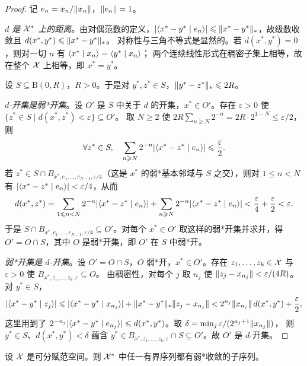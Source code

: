 \begin{proof}
记 $e_n=x_n/\lVert x_n\rVert$，$\lVert e_n\rVert=1$。

\emph{$d$ 是 $\mathcal{X}^{*}$ 上的距离}。由对偶范数的定义，$\lvert \langle x^*-y^* \mid e_n\rangle\rvert\leqslant\lVert x^*-y^*\rVert_*$，故级数收敛且 $d(x^*,y^*)\leqslant\lVert x^*-y^*\rVert_*$。
对称性与三角不等式是显然的。若 $d(x^*,y^*)=0$，则对一切 $n$ 有 $\langle x^* \mid x_n\rangle=\langle y^* \mid x_n\rangle$；
两个连续线性形式在稠密子集上相等，故在整个 $\mathcal{X}$ 上相等，即 $x^*=y^*$。

设 $S\subseteq\mathrm{B}(0,R)$，$R>0$。于是对 $y^*,z^*\in S$，$\lVert y^*-z^*\rVert_*\leqslant2R$。

\emph{$d$-开集是弱*开集}。设 $O'$ 是 $S$ 中关于 $d$ 的开集，$x^*\in O'$。存在 $\varepsilon>0$ 使 $\{z^*\in S\mid d(x^*,z^*)<\varepsilon\}\subseteq O'$。
取 $N\geqslant2$ 使 $2R\sum_{n\geqslant N}2^{-n}=2R\cdot2^{1-N}\leqslant\varepsilon/2$，则
\[
  \forall z^*\in S,\quad\sum_{n\geqslant N}2^{-n}\lvert \langle x^*-z^* \mid e_n\rangle\rvert\leqslant\frac{\varepsilon}{2}.
\]
若 $z^*\in S\cap B_{x^*,e_1,\dots,e_{N-1},\varepsilon/4}$（这是 $x^*$ 的弱*基本邻域与 $S$ 之交），则对 $1\leqslant n<N$ 有 $\lvert \langle x^*-z^* \mid e_n\rangle\rvert<\varepsilon/4$，从而
\[
  d(x^*,z^*)=\sum_{1\leqslant n<N}2^{-n}\lvert \langle x^*-z^* \mid e_n\rangle\rvert+\sum_{n\geqslant N}2^{-n}\lvert \langle x^*-z^* \mid e_n\rangle\rvert<\frac{\varepsilon}{4}+\frac{\varepsilon}{2}<\varepsilon .
\]
于是 $S\cap B_{x^*,e_1,\dots,e_{N-1},\varepsilon/4}\subseteq O'$。对每个 $x^*\in O'$ 取这样的弱*开集并求并，得 $O'=O\cap S$，其中 $O$ 是弱*开集，即 $O'$ 在 $S$ 中弱*开。

\emph{弱*开集是 $d$-开集}。设 $O'=O\cap S$，$O$ 弱*开，$x^*\in O'$。存在 $z_1,\dots,z_k\in\mathcal{X}$ 与 $\varepsilon>0$ 使 $B_{x^*,z_1,\dots,z_k,\varepsilon}\subseteq O$。
由稠密性，对每个 $j$ 取 $n_j$ 使 $\lVert z_j-x_{n_j}\rVert<\varepsilon/(4R)$。对 $y^*\in S$，
\[
  \lvert \langle x^*-y^* \mid z_j\rangle\rvert\leqslant\lvert \langle x^*-y^* \mid x_{n_j}\rangle\rvert+\lVert x^*-y^*\rVert_*\lVert z_j-x_{n_j}\rVert
  <2^{n_j}\lVert x_{n_j}\rVert\,d(x^*,y^*)+\frac{\varepsilon}{2},
\]
这里用到了 $2^{-n_j}\lvert \langle x^*-y^* \mid e_{n_j}\rangle\rvert\leqslant d(x^*,y^*)$。取 $\delta=\min_j\varepsilon/(2^{n_j+1}\lVert x_{n_j}\rVert)$，
则 $y^*\in S$、$d(x^*,y^*)<\delta$ 蕴含 $y^*\in B_{x^*,z_1,\dots,z_k,\varepsilon}\cap S\subseteq O'$。故 $O'$ 是 $d$-开集。
\end{proof}

\begin{theorem}
\label{res:77}
设 $\mathcal{X}$ 是可分赋范空间。则 $\mathcal{X}^{*}$ 中任一有界序列都有弱*收敛的子序列。
\end{theorem}

